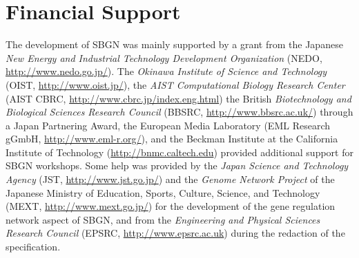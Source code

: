 \section{Financial Support}

The development of SBGN was mainly supported by a grant from the Japanese \emph{New Energy and Industrial Technology Development Organization} (NEDO, \url{http://www.nedo.go.jp/}).  The \emph{Okinawa Institute of Science and Technology} (OIST, \url{http://www.oist.jp/}), the \emph{AIST Computational Biology Research Center} (AIST CBRC, \url{http://www.cbrc.jp/index.eng.html}) the British \emph{Biotechnology and Biological Sciences Research Council} (BBSRC, \url{http://www.bbsrc.ac.uk/}) through a Japan Partnering Award, the European Media Laboratory (EML Research gGmbH, \url{http://www.eml-r.org/}), and the Beckman Institute at the California Institute of Technology (\url{http://bnmc.caltech.edu}) provided additional support for SBGN workshops.  Some help was provided by the \emph{Japan Science and Technology Agency} (JST, \url{http://www.jst.go.jp/}) and the \emph{Genome Network Project} of the Japanese Ministry of Education, Sports, Culture, Science, and Technology (MEXT, \url{http://www.mext.go.jp/}) for the development of the gene regulation network aspect of SBGN, and from the \emph{Engineering and Physical Sciences Research Council} (EPSRC, \url{http://www.epsrc.ac.uk}) during the redaction of the specification.
